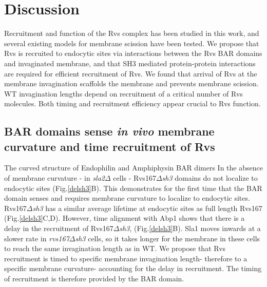 \documentclass[9pt,lineno]{elife}
\begin{document}
\section{Discussion}
Recruitment and function of the Rvs complex has been studied in this work, and several existing models for membrane scission have been tested. We propose that Rvs is recruited to endocytic sites via interactions between the Rvs BAR domains and invaginated membrane, and that SH3 mediated protein-protein interactions are required for efficient recruitment of Rvs. We found that arrival of Rvs at the membrane invagination scaffolds the membrane and prevents membrane scission. WT invagination lengths depend on recruitment of a critical number of Rvs molecules. Both timing and recruitment efficiency appear crucial to Rvs function.

\subsection{BAR domains sense \textit{in vivo} membrane curvature and time recruitment of Rvs}
The curved structure of Endophilin and Amphiphysin BAR dimers \citep{Peters2004,Mim2012} In the absence of membrane curvature - in \textit{sla2$\Delta$} cells - Rvs167\textit{$\Delta$sh3} domains do not localize to endocytic sites (Fig.\ref{delsh3}B). This demonstrates for the first time that the BAR domain senses and requires membrane curvature to localize to endocytic sites. Rvs167\textit{$\Delta$sh3} has a similar average lifetime at endocytic sites as full length Rvs167 (Fig.\ref{delsh3}C,D). However, time alignment with Abp1 shows that there is a delay in the recruitment of Rvs167\textit{$\Delta$sh3}, (Fig.\ref{delsh3}B). Sla1 moves inwards at a slower rate in \textit{rvs167$\Delta$sh3} cells, so it takes longer for the membrane in these cells to reach the same invagination length as in WT. We propose that Rvs recruitment is timed to specific membrane invagination length- therefore to a specific membrane curvature-  accounting for the delay in recruitment. The timing of recruitment is therefore provided by the BAR domain.  
\end{document}
